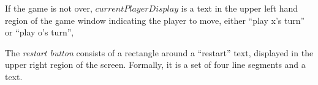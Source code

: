 \documentclass{../src/led_doc}
\begin{document}
\begin{ledDef}
\end{ledDef}

\begin{ledDef}
\end{ledDef}

\begin{ledCmnt}
If the game is not over, $currentPlayerDisplay$ is a text in the upper left hand
region of the game window indicating the player to move, either ``play x's turn'' or
``play o's turn'',
\end{ledCmnt}

\begin{ledDef}
\end{ledDef}

\begin{ledCmnt}
The {\em restart button} consists of a rectangle around a ``restart'' text,
displayed in the upper right region of the screen. Formally, it is a set of
four line segments and a text.
\end{ledCmnt}

\begin{ledDef}
\end{ledDef}

\begin{ledDef}
\end{ledDef}

\begin{ledDef}
\end{ledDef}

\begin{ledDef}
\end{ledDef}

\begin{ledDef}
\end{ledDef}
\end{document}
